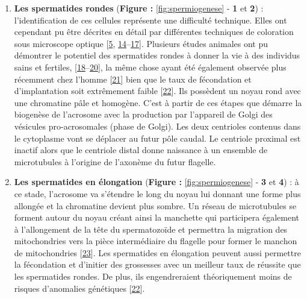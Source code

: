 \documentclass[12pt,a4paper,twoside]{ugathesis}
\theoremstyle{definition}
\theoremstyle{definition}
\theoremstyle{definition}
\theoremstyle{remark}
\begin{document}
\begin{enumerate}
\def\labelenumi{\arabic{enumi}.}
\item
  \textbf{Les spermatides rondes} (\textbf{Figure :
  }\ref{fig:spermiogenese} - \textbf{1} et \textbf{2}) :
  l'identification de ces cellules représente une difficulté technique.
  Elles ont cependant pu être décrites en détail par différentes
  techniques de coloration sous microscope optique
  {[}\protect\hyperlink{ref-Clermont1963}{5},
  \protect\hyperlink{ref-Papic}{14}--\protect\hyperlink{ref-WorldHealthOrganization1992}{17}{]}.
  Plusieurs études animales ont pu démontrer le potentiel des
  spermatides rondes à donner la vie à des individus sains et fertiles,
  {[}\protect\hyperlink{ref-Ogura1994}{18}--\protect\hyperlink{ref-Sasagawa}{20}{]},
  la même chose ayant été également observée plus récemment chez l'homme
  {[}\protect\hyperlink{ref-Tanaka2015}{21}{]} bien que le taux de
  fécondation et d'implantation soit extrêmement faible
  {[}\protect\hyperlink{ref-Asimakopoulos2003}{22}{]}. Ils possèdent un
  noyau rond avec une chromatine pâle et homogène. C'est à partir de ces
  étapes que démarre la biogenèse de l'acrosome avec la production par
  l'appareil de Golgi des vésicules pro-acrosomales (phase de Golgi).
  Les deux centrioles contenus dans le cytoplasme vont se déplacer au
  futur pôle caudal. Le centriole proximal est inactif alors que le
  centriole distal donne naissance à un ensemble de microtubules à
  l'origine de l'axonème du futur flagelle.
\item
  \textbf{Les spermatides en élongation} (\textbf{Figure :
  }\ref{fig:spermiogenese} - \textbf{3} et \textbf{4}) : à ce stade,
  l'acrosome va s'étendre le long du noyau lui donnant une forme plus
  allongée et la chromatine devient plus sombre. Un réseau de
  microtubules se forment autour du noyau créant ainsi la manchette qui
  participera également à l'allongement de la tête du spermatozoïde et
  permettra la migration des mitochondries vers la pièce intermédiaire
  du flagelle pour former le manchon de mitochondries
  {[}\protect\hyperlink{ref-Moreno2006}{23}{]}. Les spermatides en
  élongation peuvent aussi permettre la fécondation et d'initier des
  grossesses avec un meilleur taux de réussite que les spermatides
  rondes. De plus, ils engendreraient théoriquement moins de risques
  d'anomalies génétiques
  {[}\protect\hyperlink{ref-Asimakopoulos2003}{22}{]}.
\end{enumerate}

\newpage
\end{document}
